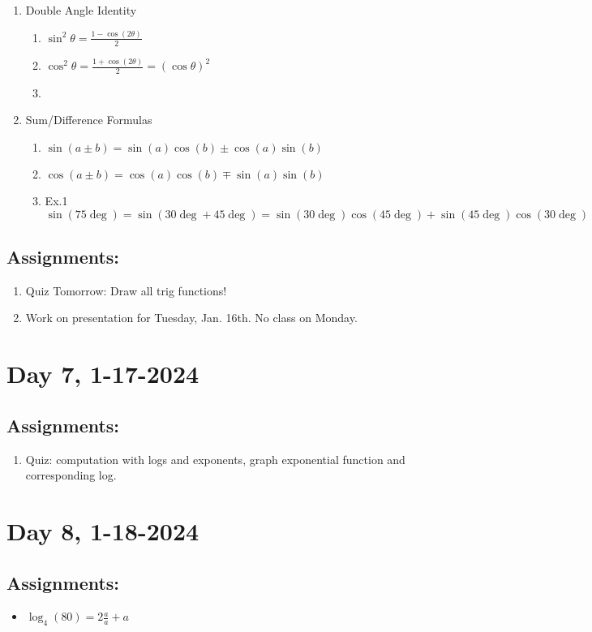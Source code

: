 \documentclass[12pt]{article}
\begin{document}
\begin{enumerate}
\begin{enumerate}
\begin{enumerate}
        \end{enumerate}
        \item Double Angle Identity
        \begin{enumerate}
            \item \(\sin^2\theta = \frac{1 - \cos(2\theta)}{2}\)
            \item \(\cos^2\theta = \frac{1 + \cos(2\theta)}{2} = (\cos\theta)^2\)
            \item 
        \end{enumerate}
        \item Sum/Difference Formulas
        \begin{enumerate}
            \item \(\sin(a \pm b) = \sin(a)\cos(b) \pm \cos(a)\sin(b)\)
            \item \(\cos(a \pm b) = \cos(a)\cos(b) \mp \sin(a)\sin(b)\)
            \item Ex.1 \(\sin(75\deg) = \sin(30\deg + 45\deg) = \sin(30\deg)\cos(45\deg)+\sin(45\deg)\cos(30\deg)\)
        \end{enumerate}
    \end{enumerate}
\end{enumerate}
\subsection{Assignments: }
\begin{enumerate}
    \item Quiz Tomorrow: Draw all trig functions!
    \item Work on presentation for Tuesday, Jan. 16th. No class on Monday.
\end{enumerate}

\section{Day 7, 1-17-2024}
\subsection{Assignments: }
\begin{enumerate}
    \item Quiz: computation with logs and exponents, graph exponential function and corresponding log.
\end{enumerate}
\section{Day 8, 1-18-2024}
\subsection{Assignments: }
\begin{itemize}
    \item \(\log _4 (80) = 2\frac{a}{a} + a\)
\end{itemize}
\end{document}
